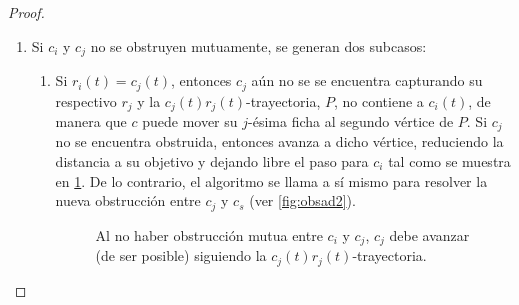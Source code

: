 \begin{proof}
\begin{enumerate}
        \item Si $c_i$ y $c_j$ no se obstruyen mutuamente, se generan dos
            subcasos:
        \begin{enumerate}
            \item Si $r_i(t)=c_j(t)$, entonces $c_j$ a\'un no se se encuentra
            capturando su respectivo $r_j$ y la $c_j(t)r_j(t)$-trayectoria, $P$,
            no contiene a $c_i(t)$, de manera que $c$ puede mover su $j$-\'esima
            ficha al segundo v\'ertice de $P$. Si $c_j$ no se encuentra
            obstruida, entonces avanza a dicho v\'ertice, reduciendo la
            distancia a su objetivo y dejando libre el paso para $c_i$ tal como
            se muestra en \cref{fig:obsad1}. De lo
            contrario, el algoritmo se llama a s\'i mismo para resolver la nueva
            obstrucci\'on entre $c_j$ y $c_s$ (ver \cref{fig:obsad2}).

            \begin{figure}[ht!]
                \begin{tcbitemize}[raster columns=2,raster equal height,
                    enhanced, colback=Black!5!white,colframe=Grey!75!black,
                    raster every box/.style={minimum for current equal height
                    group=2.5cm, valign=center, halign=center}, boxsep=0mm]
                    \tcbitem 
                    \tcbitem
                \end{tcbitemize}
                \caption{Al no haber obstrucci\'on mutua entre $c_i$ y $c_j$,
                $c_j$ debe avanzar (de ser posible) siguiendo la $c_j(t)r_j(t)
                $-trayectoria.}
                \label{fig:obsad1}
            \end{figure}


\end{enumerate}
\end{enumerate}
\end{proof}
